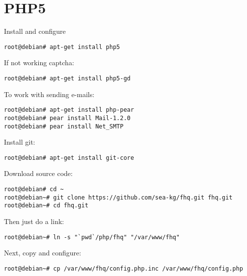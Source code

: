 \section{PHP5}
\par
Install and configure
\begin{Verbatim}[frame=single]
root@debian# apt-get install php5
\end{Verbatim}

If not working captcha:
\begin{Verbatim}[frame=single]
root@debian# apt-get install php5-gd
\end{Verbatim}

To work with sending e-mails:
\begin{Verbatim}[frame=single]
root@debian# apt-get install php-pear
root@debian# pear install Mail-1.2.0
root@debian# pear install Net_SMTP
\end{Verbatim}

Install git:
\begin{Verbatim}[frame=single]
root@debian# apt-get install git-core
\end{Verbatim}

Download source code:
\begin{Verbatim}[frame=single]
root@debian# cd ~
root@debian~# git clone https://github.com/sea-kg/fhq.git fhq.git
root@debian~# cd fhq.git
\end{Verbatim}

Then just do a link:
\begin{Verbatim}[frame=single]
root@debian~# ln -s "`pwd`/php/fhq" "/var/www/fhq"
\end{Verbatim}

Next, copy and configure:
\begin{Verbatim}[frame=single]
root@debian~# cp /var/www/fhq/config.php.inc /var/www/fhq/config.php
\end{Verbatim}